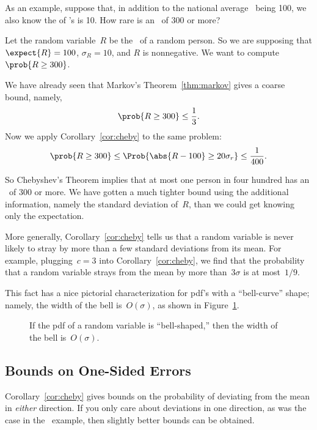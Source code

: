As an example, suppose that, in addition to the national average
\idx{\IQ}\ being 100, we also know the  of
\IQ's is 10.  How rare is an \IQ\ of 300 or more?

Let the random variable~$R$ be the \IQ\ of a random person.  So we are
supposing that $\expect{R} = 100$, $\sigma_R = 10$, and $R$ is
nonnegative.  We want to compute $\prob{R \geq 300}$.

We have already seen that Markov's Theorem~\ref{thm:markov} gives a
coarse bound, namely,
\[
  \prob{R \geq 300} \leq \frac{1}{3}.
\]
Now we apply Corollary~\ref{cor:cheby} to the same problem:
\begin{equation}\label{eqn:18I3}
\prob{R \geq 300}
    \le \Prob{\abs{R - 100} \geq 20 \sigma_r}
    \le \frac{1}{400}.
\end{equation}

So Chebyshev's Theorem implies that at most one person in four hundred
has an \IQ\ of 300 or more.  We have gotten a much tighter bound using
the additional information, namely the standard deviation of~$R$, than
we could get knowing only the expectation.

More generally, Corollary~\ref{cor:cheby} tells us that a random
variable is never likely to stray by more than a few standard
deviations from its mean.  For example, plugging~$c = 3$ into
Corollary~\ref{cor:cheby}, we find that the probability that a random
variable strays from the mean by more than~$3 \sigma$ is at
most~$1/9$.

This fact has a nice pictorial characterization for pdf's with a
``bell-curve'' shape; namely, the width of the bell is~$O(\sigma)$, as
shown in Figure~\ref{fig:stdev}.

\begin{figure}


\caption{If the pdf of a random variable is ``bell-shaped,'' then the
  width of the bell is~$O(\sigma)$.}

\label{fig:stdev}

\end{figure}

\subsection{Bounds on One-Sided Errors}

Corollary~\ref{cor:cheby} gives bounds on the probability of deviating
from the mean in \emph{either} direction.  If you only care about
deviations in one direction, as was the case in the \IQ\ example, then
slightly better bounds can be obtained.

